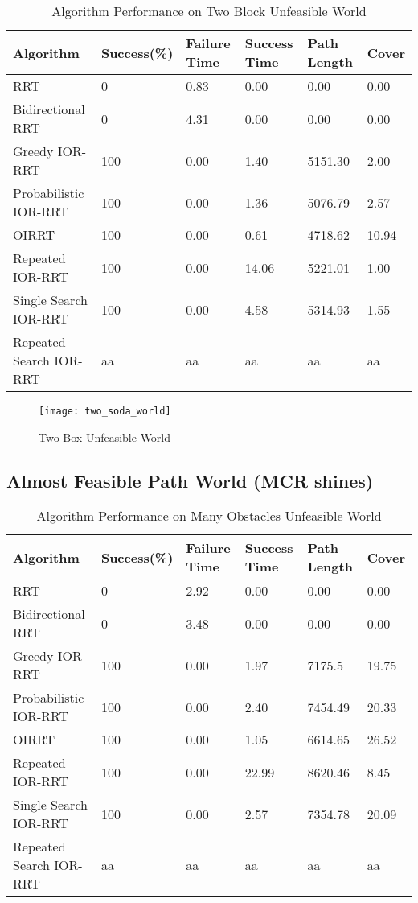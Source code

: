 \begin{table}
\begin{tabular}{@{}llllll@{}}
\toprule
Algorithm & Success(\%)  & Failure Time  & Success Time  & Path Length & Cover\\ 
\midrule
RRT & 0 & 0.83 & 0.00 & 0.00 & 0.00 \\
Bidirectional RRT & 0 & 4.31 & 0.00 & 0.00 & 0.00 \\
Greedy IOR-RRT & 100 & 0.00 & 1.40 & 5151.30 & 2.00 \\
Probabilistic IOR-RRT & 100 & 0.00 & 1.36 & 5076.79 & 2.57 \\
OIRRT & 100 & 0.00 & 0.61 & 4718.62 & 10.94 \\
Repeated IOR-RRT & 100 & 0.00 & 14.06 & 5221.01 & 1.00 \\
Single Search IOR-RRT & 100 & 0.00 & 4.58 & 5314.93 & 1.55 \\
Repeated Search IOR-RRT & aa & aa & aa & aa & aa \\
\bottomrule
\end{tabular}
\caption{Algorithm Performance on Two Block Unfeasible World}
\label{tab:two_soda_world}
\end{table}

\begin{figure}[h]
    \centering
    \texttt{[image: two\_soda\_world]}
    \caption{Two Box Unfeasible World}
    \label{fig:two_soda_world}
\end{figure}

\subsection{Almost Feasible Path World (MCR shines)}

\begin{table}
\begin{tabular}{@{}llllll@{}}
\toprule
Algorithm & Success(\%)  & Failure Time  & Success Time  & Path Length & Cover\\ 
\midrule
RRT & 0 & 2.92 & 0.00 & 0.00 & 0.00 \\
Bidirectional RRT & 0 & 3.48 & 0.00 & 0.00 & 0.00 \\
Greedy IOR-RRT & 100 & 0.00 & 1.97 & 7175.5 & 19.75 \\
Probabilistic IOR-RRT & 100 & 0.00 & 2.40 & 7454.49 & 20.33 \\
OIRRT & 100 & 0.00 & 1.05 & 6614.65 & 26.52 \\
Repeated IOR-RRT & 100 & 0.00 & 22.99 & 8620.46 & 8.45 \\
Single Search IOR-RRT & 100 & 0.00 & 2.57 & 7354.78 & 20.09 \\
Repeated Search IOR-RRT & aa & aa & aa & aa & aa \\
\bottomrule
\end{tabular}
\caption{Algorithm Performance on Many Obstacles Unfeasible World}
\label{tab:many_obstacles_unfeasible_world}
\end{table}

